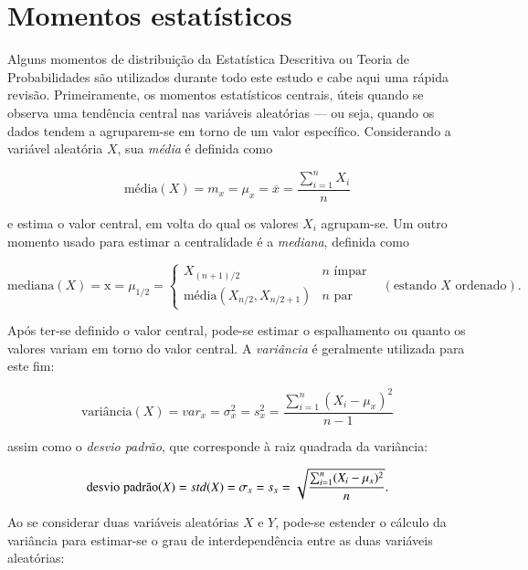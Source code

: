 \section{Momentos estatísticos}
\label{sec:momentos}

Alguns momentos de distribuição da Estatística Descritiva ou Teoria de
Probabilidades são utilizados durante todo este estudo e cabe aqui uma
rápida revisão. Primeiramente, os momentos estatísticos centrais,
úteis quando se observa uma tendência central nas variáveis aleatórias
--- ou seja, quando os dados tendem a agruparem-se em torno de um
valor específico. Considerando a variável aleatória $X$,
sua \textit{média} é definida como~\cite{recipes}

\begin{equation}
\text{média}(X) = m_x=\mu_x=\overline{x}=\frac{\sum_{i=1}^{n}X_i}{n}
\end{equation}

\noindent e estima o valor central, em volta do qual os valores $X_i$ agrupam-se. Um outro momento usado para estimar a centralidade é a \textit{mediana}, definida como

\begin{equation}
\text{mediana}(X) = \text{\~{x}} =\mu_{1/2}= \begin{cases}
                               X_{(n+1)/2} & n \,\, \text{ímpar} \\
                               \text{média}(X_{n/2}, X_{n/2+1}) & n \,\, \text{par}
                               \end{cases} \,\,\,\,\, (\text{estando $X$ ordenado}).
\end{equation}

Após ter-se definido o valor central, pode-se estimar o
espalhamento ou quanto os valores variam em torno do valor
central. A \textit{variância} é geralmente utilizada para este fim:

\begin{equation}
\text{variância}(X)=var_x=\sigma^2_x=s^2_x=\frac{\sum_{i=1}^{n}(X_i-\mu_x)^2}{n-1}
\end{equation}

\noindent assim como o \textit{desvio padrão}, que corresponde à raiz quadrada da variância:

\begin{equation}
\text{desvio\;padrão}(X)=std(X)=\sigma_x=s_x=\sqrt{\frac{\sum_{i=1}^{n}(X_i-\mu_x)^2}{n}}.
\end{equation}

Ao se considerar duas variáveis aleatórias $X$ e $Y$, pode-se estender
o cálculo da variância para estimar-se o grau de interdependência
entre as duas variáveis aleatórias:

